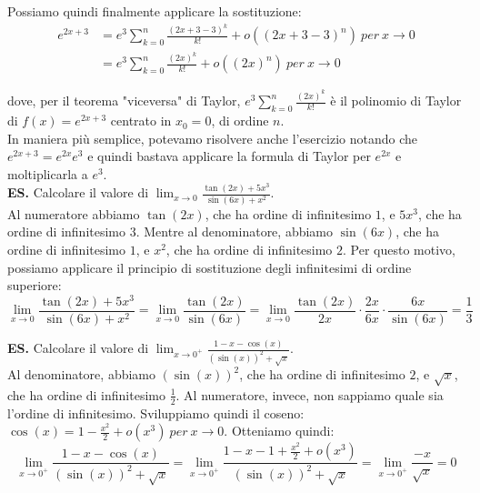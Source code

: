 \documentclass{article}
\begin{document}
\noindent Possiamo quindi finalmente applicare la sostituzione:
\begin{align*}
    e^{2x + 3} &= e^3 \sum_{k = 0}^n \frac{(2x + 3 - 3)^k}{k!} + o((2x + 3 - 3)^n) \ per \ x \to 0\\
    &= e^3 \sum_{k = 0}^n \frac{(2x)^k}{k!} + o ((2x)^n) \ per \ x \to 0
\end{align*}

\noindent dove, per il teorema "viceversa" di Taylor, $e^3\sum_{k = 0}^n \frac{(2x)^k}{k!}$ è il polinomio di Taylor di $f(x) = e^{2x + 3}$ centrato in $x_0 = 0$, di ordine $n$.\\

\noindent In maniera più semplice, potevamo risolvere anche l'esercizio notando che $e^{2x + 3} = e^{2x} e^3$ e quindi bastava applicare la formula di Taylor per $e^{2x}$ e moltiplicarla a $e^3$.\\

\noindent\textbf{ES.} Calcolare il valore di $\lim_{x \to 0} \frac{\tan(2x) + 5x^3}{\sin(6x) + x^2}$.\\
Al numeratore abbiamo $\tan(2x)$, che ha ordine di infinitesimo $1$, e $5x^3$, che ha ordine di infinitesimo $3$. Mentre al denominatore, abbiamo $\sin(6x)$, che ha ordine di infinitesimo $1$, e $x^2$, che ha ordine di infinitesimo $2$. Per questo motivo, possiamo applicare il principio di sostituzione degli infinitesimi di ordine superiore:
\begin{equation*}
    \lim_{x \to 0} \frac{\tan(2x) + 5x^3}{\sin(6x) + x^2} = \lim_{x \to 0} \frac{\tan(2x)}{\sin(6x)} = \lim_{x \to 0} \frac{\tan(2x)}{2x} \cdot \frac{2x}{6x} \cdot \frac{6x}{\sin(6x)} = \frac{1}{3}
\end{equation*}

\noindent\textbf{ES.} Calcolare il valore di $\lim_{x \to 0^+} \frac{1 - x - \cos(x)}{(\sin(x))^2 + \sqrt{x}}$.\\
Al denominatore, abbiamo $(\sin(x))^2$, che ha ordine di infinitesimo $2$, e $\sqrt{x}$, che ha ordine di infinitesimo $\frac{1}{2}$. Al numeratore, invece, non sappiamo quale sia l'ordine di infinitesimo. Sviluppiamo quindi il coseno: $\cos(x) = 1 - \frac{x^2}{2} + o(x^3) \ per \ x \to 0$. Otteniamo quindi:
\begin{equation*}
    \lim_{x \to 0^+} \frac{1 - x - \cos(x)}{(\sin(x))^2 + \sqrt{x}} = \lim_{x \to 0^+} \frac{1 - x - 1 + \frac{x^2}{2} + o(x^3)}{(\sin(x))^2 + \sqrt{x}} = \lim_{x \to 0^+} \frac{-x}{\sqrt{x}} = 0
\end{equation*}
\end{document}
